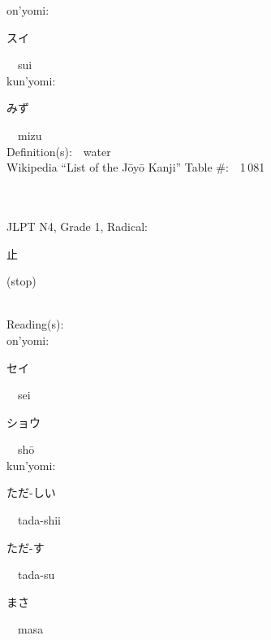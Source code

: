 \begin{multicols}{2}
{\hspace*{1em}}on'yomi:\ \ \\
{\hspace*{2em}}{\begin{CJK}{UTF8}{min} スイ \end{CJK}}\ \ sui\ \ \\
{\hspace*{1em}}kun'yomi:\ \ \\
{\hspace*{2em}}{\begin{CJK}{UTF8}{min} みず \end{CJK}}\ \ mizu\ \ \\
Definition(s):\ \ water \\
Wikipedia ``List of the J\=oy\=o Kanji'' Table \#:\ \ 1\,081 \\
\ \ \\
{\fontsize{34pt}{40pt}  }\ \ \\  %
{JLPT N4, Grade 1, Radical:\ \ {\begin{CJK}{UTF8}{min} 止 \end{CJK}} (stop) } \\
Reading(s):\ \ \\
{\hspace*{1em}}on'yomi:\ \ \\
{\hspace*{2em}}{\begin{CJK}{UTF8}{min} セイ \end{CJK}}\ \ sei\ \ \\
{\hspace*{2em}}{\begin{CJK}{UTF8}{min} ショウ \end{CJK}}\ \ sh\=o\ \ \\
{\hspace*{1em}}kun'yomi:\ \ \\
{\hspace*{2em}}{\begin{CJK}{UTF8}{min} ただ-しい \end{CJK}}\ \ tada-shii\ \ \\
{\hspace*{2em}}{\begin{CJK}{UTF8}{min} ただ-す \end{CJK}}\ \ tada-su\ \ \\
{\hspace*{2em}}{\begin{CJK}{UTF8}{min} まさ \end{CJK}}\ \ masa\ \ \\

\end{multicols}
